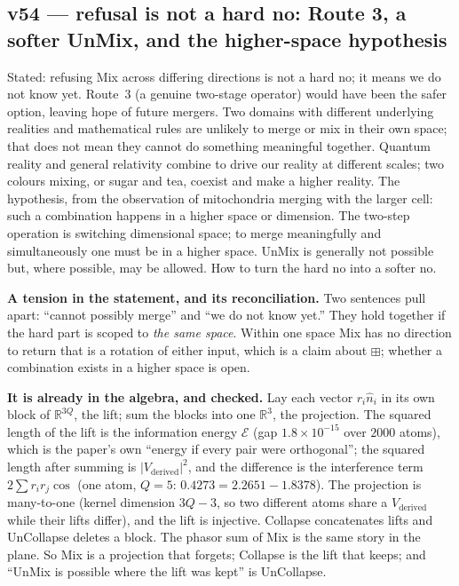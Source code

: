 \documentclass[11pt]{article}
\begin{document}
\subsection*{v54 --- refusal is not a hard no: Route 3, a softer UnMix, and the higher-space hypothesis}
Stated: refusing Mix across differing directions is not a hard no; it means we do not know yet. Route~3 (a genuine two-stage operator) would have been the safer option, leaving hope of future mergers. Two domains with different underlying realities and mathematical rules are unlikely to merge or mix in their own space; that does not mean they cannot do something meaningful together. Quantum reality and general relativity combine to drive our reality at different scales; two colours mixing, or sugar and tea, coexist and make a higher reality.
The hypothesis, from the observation of mitochondria merging with the larger cell: such a combination happens in a higher space or dimension. The two-step operation is switching dimensional space; to merge meaningfully and simultaneously one must be in a higher space. UnMix is generally not possible but, where possible, may be allowed. How to turn the hard no into a softer no.

\textbf{A tension in the statement, and its reconciliation.} Two sentences pull apart: ``cannot possibly merge'' and ``we do not know yet.'' They hold together if the hard part is scoped to \emph{the same space}. Within one space Mix has no direction to return that is a rotation of either input, which is a claim about $\boxplus$; whether a combination exists in a higher space is open.

\textbf{It is already in the algebra, and checked.} Lay each vector $r_i\hat n_i$ in its own block of $\mathbb R^{3Q}$, the lift; sum the blocks into one $\mathbb R^3$, the projection. The squared length of the lift is the information energy $\mathcal E$ (gap $1.8\times10^{-15}$ over $2000$ atoms), which is the paper's own ``energy if every pair were orthogonal'';
the squared length after summing is $\lvert V_{\text{derived}}\rvert^2$, and the difference is the interference term $2\sum r_ir_j\cos$ (one atom, $Q=5$: $0.4273=2.2651-1.8378$). The projection is many-to-one (kernel dimension $3Q-3$, so two different atoms share a $V_{\text{derived}}$ while their lifts differ), and the lift is injective. Collapse concatenates lifts and UnCollapse deletes a block. The phasor sum of Mix is the same story in the plane.
So Mix is a projection that forgets; Collapse is the lift that keeps; and ``UnMix is possible where the lift was kept'' is UnCollapse.
\end{document}
